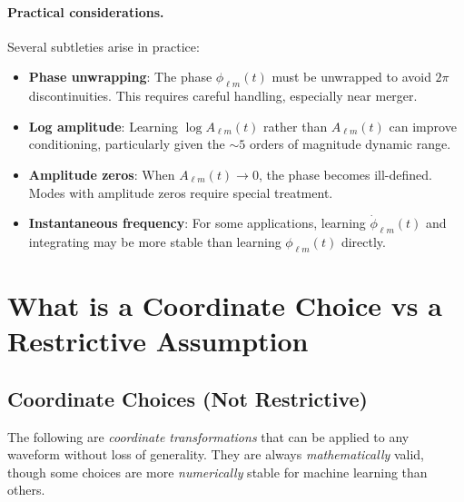 \documentclass[11pt,a4paper]{article}
\newcommand{\Alm}{A_{\ell m}}
\newcommand{\philm}{\phi_{\ell m}}
\begin{document}
\paragraph{Practical considerations.} Several subtleties arise in practice:
\begin{itemize}
    \item \textbf{Phase unwrapping}: The phase $\philm(t)$ must be unwrapped to avoid $2\pi$ discontinuities. This requires careful handling, especially near merger.
    \item \textbf{Log amplitude}: Learning $\log \Alm(t)$ rather than $\Alm(t)$ can improve conditioning, particularly given the $\sim5$ orders of magnitude dynamic range.
    \item \textbf{Amplitude zeros}: When $\Alm(t) \to 0$, the phase becomes ill-defined. Modes with amplitude zeros require special treatment.
    \item \textbf{Instantaneous frequency}: For some applications, learning $\dot{\phi}_{\ell m}(t)$ and integrating may be more stable than learning $\philm(t)$ directly.
\end{itemize}

\section{What is a Coordinate Choice vs a Restrictive Assumption}

\subsection{Coordinate Choices (Not Restrictive)}

The following are \emph{coordinate transformations} that can be applied to any waveform without loss of generality. They are always \emph{mathematically} valid, though some choices are more \emph{numerically} stable for machine learning than others.
\end{document}
